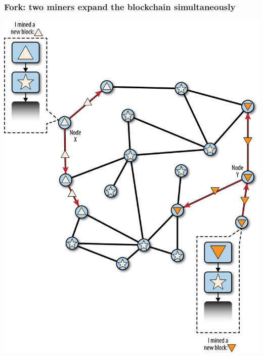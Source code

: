 \documentclass[11pt]{beamer}  %
\begin{document}
\begin{frame}\frametitle{Fork: two miners expand the blockchain simultaneously}

  \begin{center}
    \includegraphics[scale=0.53,clip=false]{pictures/mbc2_1003.png}
  \end{center}

\end{frame}
\end{document}
